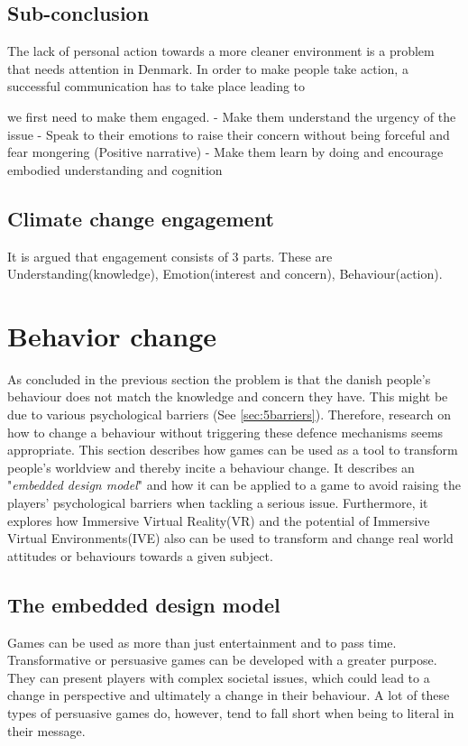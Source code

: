    
    \subsection{Sub-conclusion}
        The lack of personal action towards a more cleaner environment is a problem that needs attention in Denmark.
        In order to make people take action, a successful communication has to take place leading to 
        
        we first need to make them engaged.
        - Make them understand the urgency of the issue
        - Speak to their emotions to raise their concern without being forceful and fear mongering (Positive narrative)
        - Make them learn by doing and encourage embodied understanding and cognition
    
    \subsection{Climate change engagement}
        It is argued that engagement consists of 3 parts. These are Understanding(knowledge), Emotion(interest and concern), Behaviour(action)\cite{climateChangeEngagement3Elements, vrEngagementClimateChange, reorientingClimageChangeCommunication}.
        
        
\section{Behavior change}
    As concluded in the previous section the problem is that the danish people's behaviour does not match the knowledge and concern they have. This might be due to various psychological barriers (See \autoref{sec:5barriers}). Therefore, research on how to change a behaviour without triggering these defence mechanisms seems appropriate.
    This section describes how games can be used as a tool to transform people's worldview and thereby incite a behaviour change. It describes an "\textit{embedded design model}" and how it can be applied to a game to avoid raising the players' psychological barriers when tackling a serious issue. 
    Furthermore, it explores how Immersive Virtual Reality(VR) and the potential of Immersive Virtual Environments(IVE) also can be used to transform and change real world attitudes or behaviours towards a given subject.
    
   \subsection{The embedded design model}
    Games can be used as more than just entertainment and to pass time. Transformative or persuasive games can be developed with a greater purpose\cite{transformationalFramework}. They can present players with complex societal issues, which could lead to a change in perspective and ultimately a change in their behaviour\cite{persuasiveGameplay}. A lot of these types of persuasive games do, however, tend to fall short when being to literal in their message\cite{embeddedDesignModel}.
    
